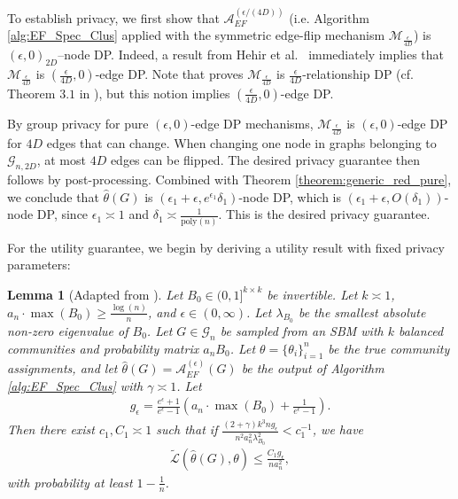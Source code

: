 \documentclass{article}
\newtheorem{lemma}{Lemma}
\newcommand{\thetahat}{\ensuremath{\widehat{\theta}}}
\begin{document}
To establish privacy, we first show that $\mathcal{A}_{EF}^{(\epsilon/(4D))}$ (i.e. Algorithm \ref{alg:EF_Spec_Clus} applied with the symmetric edge-flip mechanism $\mathcal{M}_{\frac{\epsilon}{4D}}$) is $(\epsilon, 0)_{2D}$–node DP.
Indeed, a result from Hehir et al.~\cite{HehEtal22} immediately implies that $\mathcal{M}_{\frac{\epsilon}{4D}}$ is $\left(\frac{\epsilon}{4D}, 0\right)$-edge DP. Note that \cite{HehEtal22} proves $\mathcal{M}_{\frac{\epsilon}{4D}}$ is $\frac{\epsilon}{4D}$-relationship DP (cf. Theorem $3.1$ in \cite{HehEtal22}), but this notion implies $\left(\frac{\epsilon}{4D}, 0\right)$-edge DP. 

By group privacy for pure $(\epsilon, 0)$-edge DP mechanisms, $\mathcal{M}_{\frac{\epsilon}{4D}}$ is $(\epsilon, 0)$-edge DP for $4D$ edges that can change. When changing one node in graphs belonging to $\mathcal{G}_{n, 2D}$, at most $4D$ edges can be flipped. The desired privacy guarantee then follows by post-processing. Combined with Theorem \ref{theorem:generic_red_pure}, we conclude that $\thetahat(G)$ is $(\epsilon_1 + \epsilon, e^{\epsilon_1}\delta_1)$-node DP, which is $(\epsilon_1 + \epsilon, O(\delta_1))$-node DP, since $\epsilon_1 \asymp 1$ and $\delta_1 \asymp \frac{1}{\mathrm{poly}(n)}$. This is the desired privacy guarantee.

For the utility guarantee, we begin by deriving a utility result with fixed privacy parameters:

\begin{lemma}[Adapted from \cite{HehEtal22}]
\label{lemma:Edge_Flip_Ut}
Let $B_0 \in (0, 1]^{k \times k}$ be invertible. Let $k \asymp 1$, $a_n \cdot\max(B_0) \geq \frac{\log(n)}{n}$, and $\epsilon \in (0, \infty)$. Let $\lambda_{B_0}$ be the smallest absolute non-zero eigenvalue of $B_0$. Let $G \in \mathcal{G}_{n}$ be sampled from an SBM with $k$ balanced communities and probability matrix  $a_n B_0$. Let $\theta = \{\theta_i\}_{i = 1}^n$ be the true community assignments, and let $\thetahat(G) = \mathcal{A}_{EF}^{(\epsilon)}(G)$ be the output of Algorithm \ref{alg:EF_Spec_Clus} with $\gamma \asymp 1$. Let 
\begin{align*}
g_{\epsilon} = \frac{e^{\epsilon} + 1}{e^{\epsilon} - 1}\left(a_n \cdot\max(B_0) + \frac{1}{e^{\epsilon} - 1}\right).
\end{align*}
Then there exist $c_1, C_1 \asymp 1$ such that if $\frac{(2 + \gamma)k^3ng_\epsilon}{n^2a_n ^2\lambda_{B_0}^2} < c_1^{-1}$, we have
\begin{align*}
\widetilde{\mathcal{L}}\left(\thetahat(G), \theta\right) \leq \frac{C_1g_\epsilon}{na_n^2},
\end{align*}
with probability at least $1 - \frac{1}{n}$.
\end{lemma}
\end{document}

